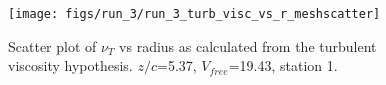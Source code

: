 \begin{figure}[H]
\centering
\texttt{[image: figs/run\_3/run\_3\_turb\_visc\_vs\_r\_meshscatter]}
\caption{Scatter plot of $\nu_T$ vs radius as calculated from the turbulent viscosity hypothesis. $z/c$=5.37, $V_{free}$=19.43, station 1.}
\label{fig:run_3_turb_visc_vs_r_meshscatter}
\end{figure}


